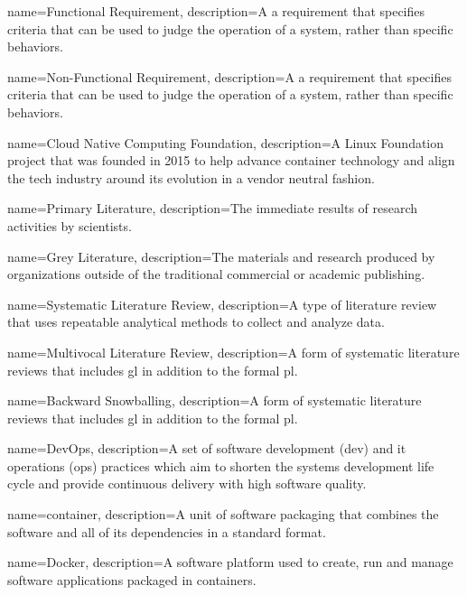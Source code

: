 {
    name={Functional Requirement},
    description={A a requirement that specifies criteria that can be used to judge the operation of a system, rather than specific behaviors.}
}


{
    name={Non-Functional Requirement},
    description={A a requirement that specifies criteria that can be used to judge the operation of a system, rather than specific behaviors.}
}

{
    name={Cloud Native Computing Foundation},
    description={A Linux Foundation project that was founded in 2015 to help advance container technology and align the tech industry around its evolution in a vendor neutral fashion.}
}

{
    name={Primary Literature},
    description={The immediate results of research activities by scientists.}
}

{
    name={Grey Literature},
    description={The materials and research produced by organizations outside of the traditional commercial or academic publishing.}
}

{
    name={Systematic Literature Review},
    description={A type of literature review that uses repeatable analytical methods to collect and analyze data.}
}

{
    name={Multivocal Literature Review},
    description={A form of systematic literature reviews that includes \gls{gl} in addition to the formal \gls{pl}.}
}

{
    name={Backward Snowballing},
    description={A form of systematic literature reviews that includes \gls{gl} in addition to the formal \gls{pl}.}
}

{
    name={DevOps},
    description={A set of software development (dev) and it operations (ops) practices which aim to shorten the systems development life cycle and provide continuous delivery with high software quality.}
}

{
    name={container},
    description={A unit of software packaging that combines the software and all of its dependencies in a standard format.}
}

{
    name={Docker},
    description={A software platform used to create, run and manage software applications packaged in \glspl{container}.}
}

